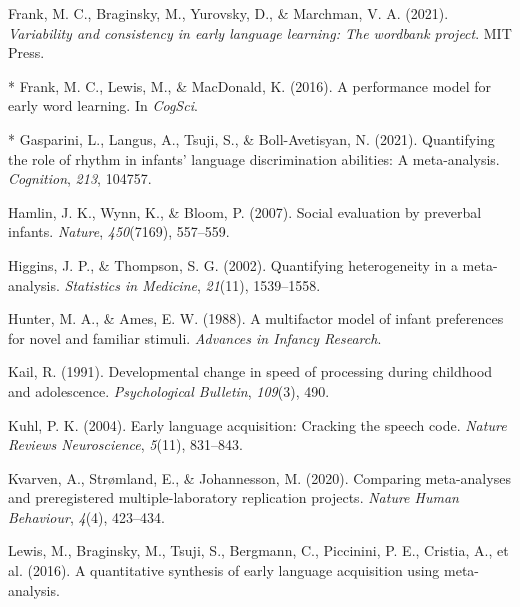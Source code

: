 \documentclass[10pt, letterpaper]{article}
\newenvironment{CSLReferences}%
  {}%
  {\par}
\begin{document}
\begin{CSLReferences}{1}{0}
\leavevmode{}%
Frank, M. C., Braginsky, M., Yurovsky, D., \& Marchman, V. A. (2021).
\emph{Variability and consistency in early language learning: The
wordbank project}. MIT Press.

\leavevmode{}%
* Frank, M. C., Lewis, M., \& MacDonald, K. (2016). A performance model
for early word learning. In \emph{CogSci}.

\leavevmode{}%
* Gasparini, L., Langus, A., Tsuji, S., \& Boll-Avetisyan, N. (2021).
Quantifying the role of rhythm in infants' language discrimination
abilities: A meta-analysis. \emph{Cognition}, \emph{213}, 104757.

\leavevmode{}%
Hamlin, J. K., Wynn, K., \& Bloom, P. (2007). Social evaluation by
preverbal infants. \emph{Nature}, \emph{450}(7169), 557--559.

\leavevmode{}%
Higgins, J. P., \& Thompson, S. G. (2002). Quantifying heterogeneity in
a meta-analysis. \emph{Statistics in Medicine}, \emph{21}(11),
1539--1558.

\leavevmode{}%
Hunter, M. A., \& Ames, E. W. (1988). A multifactor model of infant
preferences for novel and familiar stimuli. \emph{Advances in Infancy
Research}.

\leavevmode{}%
Kail, R. (1991). Developmental change in speed of processing during
childhood and adolescence. \emph{Psychological Bulletin}, \emph{109}(3),
490.

\leavevmode{}%
Kuhl, P. K. (2004). Early language acquisition: Cracking the speech
code. \emph{Nature Reviews Neuroscience}, \emph{5}(11), 831--843.

\leavevmode{}%
Kvarven, A., Strømland, E., \& Johannesson, M. (2020). Comparing
meta-analyses and preregistered multiple-laboratory replication
projects. \emph{Nature Human Behaviour}, \emph{4}(4), 423--434.

\leavevmode{}%
Lewis, M., Braginsky, M., Tsuji, S., Bergmann, C., Piccinini, P. E.,
Cristia, A., et al. (2016). A quantitative synthesis of early language
acquisition using meta-analysis.


\end{CSLReferences}
\end{document}
